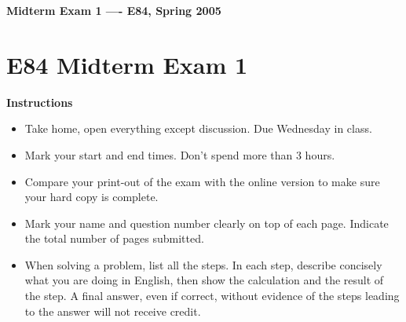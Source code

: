 \usepackage{html}

\begin{center}
{\Large \bf  Midterm Exam 1 ---- E84, Spring 2005}
\end{center}

\section*{E84 Midterm Exam 1}

{\bf Instructions}
\begin{itemize}
\item Take home, open everything except discussion. Due Wednesday in class.
\item Mark your start and end times. Don't spend more than 3 hours.
\item Compare your print-out of the exam with the online version to make
	sure your hard copy is complete.
\item Mark your name and question number clearly on top of each page.
	Indicate the total number of pages submitted.
\item When solving a problem, list all the steps. In each step, describe 
	concisely what you are doing in English, then show the calculation 
	and the result of the step. A final answer, even if correct, without 
	evidence of the steps leading to the answer will not receive credit.
\end{itemize}

